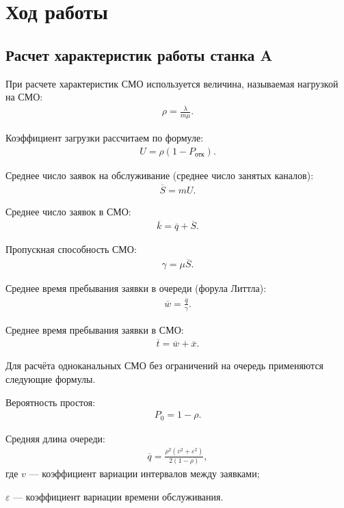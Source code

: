\section{Ход работы}

\subsection{Расчет характеристик работы станка A}

При расчете характеристик СМО используется величина, называемая нагрузкой на СМО:
\begin{align}
	\label{fmla:rho}
	\rho = \frac{\lambda}{m\mu}.
\end{align}

Коэффициент загрузки рассчитаем по формуле:
\begin{align}
	U = \rho (1 - P_{\text{отк}}).
\end{align}

Среднее число заявок на обслуживание (среднее число занятых каналов):
\begin{align}
	\overline{S} = mU.
\end{align}

Среднее число заявок в СМО:
\begin{align}
	\overline{k} = \overline{q} + \overline{S}.
\end{align}

Пропускная способность СМО:
\begin{align}
	\gamma = \mu \overline{S}.
\end{align}

Среднее время пребывания заявки в очереди (форула Литтла):
\begin{align}
	\overline{w} = \frac{\overline{q}}{\gamma}.
\end{align}

Среднее время пребывания заявки в СМО:
\begin{align}
	\overline{t} = \overline{w} + \overline{x}.
\end{align}

Для расчёта одноканальных СМО без ограничений на очередь применяются следующие формулы.

Вероятность простоя:
\begin{align}
	P_0 = 1 - \rho.
\end{align}

Средняя длина очереди:
\begin{align}
	\label{fmla:q}
	\overline{q} = \frac{\rho^2(v^2+\varepsilon^2)}{2(1 - \rho)},
\end{align}
где \hspace{1mm} $v$ --- коэффициент вариации интервалов между заявками; \par 
$\varepsilon$ --- коэффициент вариации времени обслуживания. \\

